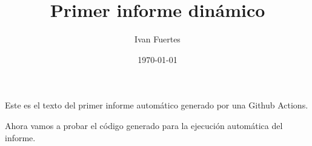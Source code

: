 \documentclass[12pt, a4paper]{book}
\title{Primer informe dinámico}
\author{Ivan Fuertes}
\date{\today}
\begin{document}
\maketitle

Este es el texto del primer informe automático generado por una Github Actions.\newline

Ahora vamos a probar el código generado para la ejecución automática del informe.
\end{document}
